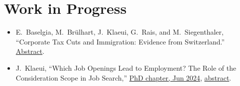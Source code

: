 \documentclass[11pt]{article}
\begin{document}
\section{Work in Progress}
\begin{itemize}
\item E.~Baselgia, M.~Br\"ulhart, J.~Klaeui, G.~Rais, and M.~Siegenthaler, ``Corporate Tax Cuts and Immigration: Evidence from Switzerland.'' \hyperlink{abs:ctax}{Abstract}.
\item J.~Klaeui, ``Which Job Openings Lead to Employment? The Role of the Consideration Scope in Job Search,'' \href{https://api.unil.ch/iris/server/api/core/bitstreams/031700df-f881-4e74-bfe3-51930f2ca265/content#page=28}{PhD chapter, Jun 2024}, \hyperlink{abs:consid}{abstract}.
\end{itemize}

\end{document}
